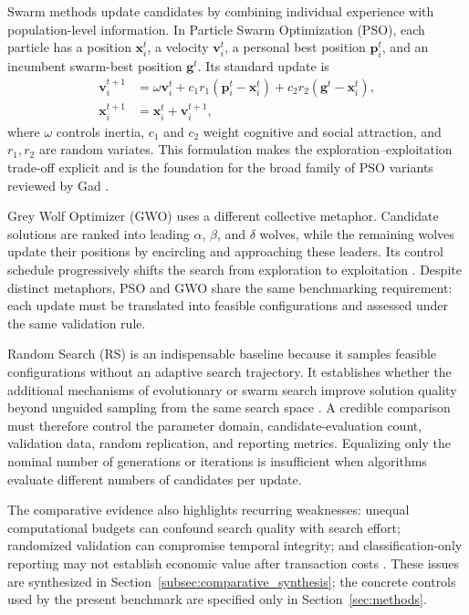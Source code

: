 Swarm methods update candidates by combining individual experience with population-level information. In Particle Swarm Optimization (PSO), each particle has a position $\mathbf{x}_{i}^{t}$, a velocity $\mathbf{v}_{i}^{t}$, a personal best position $\mathbf{p}_{i}^{t}$, and an incumbent swarm-best position $\mathbf{g}^{t}$. Its standard update is
\begin{align}
\mathbf{v}_{i}^{t+1} &= \omega\mathbf{v}_{i}^{t} + c_{1}r_{1}\left(\mathbf{p}_{i}^{t}-\mathbf{x}_{i}^{t}\right) + c_{2}r_{2}\left(\mathbf{g}^{t}-\mathbf{x}_{i}^{t}\right), \label{eq:pso_velocity}\\
\mathbf{x}_{i}^{t+1} &= \mathbf{x}_{i}^{t} + \mathbf{v}_{i}^{t+1}, \label{eq:pso_position}
\end{align}
where $\omega$ controls inertia, $c_{1}$ and $c_{2}$ weight cognitive and social attraction, and $r_{1},r_{2}$ are random variates. This formulation makes the exploration--exploitation trade-off explicit and is the foundation for the broad family of PSO variants reviewed by Gad \cite{kennedy1995pso, gad2022pso_comprehensive}.

Grey Wolf Optimizer (GWO) uses a different collective metaphor. Candidate solutions are ranked into leading $\alpha$, $\beta$, and $\delta$ wolves, while the remaining wolves update their positions by encircling and approaching these leaders. Its control schedule progressively shifts the search from exploration to exploitation \cite{faris2018gwo_review, al_bannoud2026accelerating}. Despite distinct metaphors, PSO and GWO share the same benchmarking requirement: each update must be translated into feasible configurations and assessed under the same validation rule.

Random Search (RS) is an indispensable baseline because it samples feasible configurations without an adaptive search trajectory. It establishes whether the additional mechanisms of evolutionary or swarm search improve solution quality beyond unguided sampling from the same search space \cite{bergstra2012random_search}. A credible comparison must therefore control the parameter domain, candidate-evaluation count, validation data, random replication, and reporting metrics. Equalizing only the nominal number of generations or iterations is insufficient when algorithms evaluate different numbers of candidates per update.

The comparative evidence also highlights recurring weaknesses: unequal computational budgets can confound search quality with search effort; randomized validation can compromise temporal integrity; and classification-only reporting may not establish economic value after transaction costs \cite{ecer2020mlp_ga_pso, bandgar2025finchronos, billah2024nca_moving_average}. These issues are synthesized in Section~\ref{subsec:comparative_synthesis}; the concrete controls used by the present benchmark are specified only in Section~\ref{sec:methods}.


